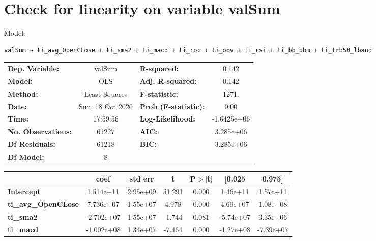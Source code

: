 \section{Check for linearity on variable valSum}

Model: \begin{verbatim}valSum ~ ti_avg_OpenCLose + ti_sma2 + ti_macd + ti_roc + ti_obv + ti_rsi + ti_bb_bbm + ti_trb50_lband\end{verbatim}

\begin{center}
\begin{tabular}{lclc}
\toprule
\textbf{Dep. Variable:}     &      valSum      & \textbf{  R-squared:         } &      0.142   \\
\textbf{Model:}             &       OLS        & \textbf{  Adj. R-squared:    } &      0.142   \\
\textbf{Method:}            &  Least Squares   & \textbf{  F-statistic:       } &      1271.   \\
\textbf{Date:}              & Sun, 18 Oct 2020 & \textbf{  Prob (F-statistic):} &      0.00    \\
\textbf{Time:}              &     17:59:56     & \textbf{  Log-Likelihood:    } & -1.6425e+06  \\
\textbf{No. Observations:}  &       61227      & \textbf{  AIC:               } &  3.285e+06   \\
\textbf{Df Residuals:}      &       61218      & \textbf{  BIC:               } &  3.285e+06   \\
\textbf{Df Model:}          &           8      & \textbf{                     } &              \\
\bottomrule
\end{tabular}
\begin{tabular}{lcccccc}
                            & \textbf{coef} & \textbf{std err} & \textbf{t} & \textbf{P$> |$t$|$} & \textbf{[0.025} & \textbf{0.975]}  \\
\midrule
\textbf{Intercept}          &    1.514e+11  &     2.95e+09     &    51.291  &         0.000        &     1.46e+11    &     1.57e+11     \\
\textbf{ti\_avg\_OpenCLose} &    7.736e+07  &     1.55e+07     &     4.978  &         0.000        &     4.69e+07    &     1.08e+08     \\
\textbf{ti\_sma2}           &   -2.702e+07  &     1.55e+07     &    -1.744  &         0.081        &    -5.74e+07    &     3.35e+06     \\
\textbf{ti\_macd}           &   -1.002e+08  &     1.34e+07     &    -7.464  &         0.000        &    -1.27e+08    &    -7.39e+07     \\

\end{tabular}
\end{center}
